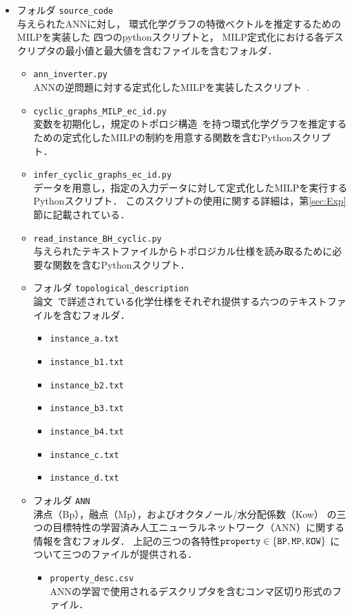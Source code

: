 \documentclass[11pt, titlepage, dvipdfmx, twoside]{jarticle}
\newcommand{\target}{目標}
\begin{document}
\begin{itemize}

\item フォルダ {\tt source\_code}\\
  与えられたANNに対し，
  環式化学グラフの特徴ベクトルを推定するためのMILPを実装した
  四つのpythonスクリプトと，
  MILP定式化における各デスクリプタの最小値と最大値を含むファイルを含むフォルダ．

\begin{itemize}

\item {\tt ann\_inverter.py}\\
ANNの逆問題に対する定式化したMILPを実装したスクリプト~\cite{AN19}.

\item {\tt cyclic\_graphs\_MILP\_ec\_id.py}\\
変数を初期化し，規定のトポロジ構造~\cite{cyclic_BH_arxiv}を持つ環式化学グラフを推定するための定式化したMILPの制約を用意する関数を含むPythonスクリプト．

\item {\tt infer\_cyclic\_graphs\_ec\_id.py}\\
データを用意し，指定の入力データに対して定式化したMILPを実行するPythonスクリプト．
このスクリプトの使用に関する詳細は，第\ref{sec:Exp}節に記載されている．

\item {\tt read\_instance\_BH\_cyclic.py}\\
与えられたテキストファイルからトポロジカル仕様を読み取るために必要な関数を含むPythonスクリプト．

\item フォルダ {\tt topological\_description}\\
論文~\cite{cyclic_BH_arxiv}で詳述されている化学仕様をそれぞれ提供する六つのテキストファイルを含むフォルダ．
%
\begin{itemize}
 \item {\tt instance\_a.txt}
 \item {\tt instance\_b1.txt}
 \item {\tt instance\_b2.txt}
 \item {\tt instance\_b3.txt}
 \item {\tt instance\_b4.txt}
 \item {\tt instance\_c.txt}
 \item {\tt instance\_d.txt}
\end{itemize}

\item フォルダ {\tt ANN}\\
沸点（Bp），融点（Mp），およびオクタノール/水分配係数（Kow）
の三つの\target 特性の学習済み人工ニューラルネットワーク（ANN）に関する情報を含むフォルダ．
上記の三つの各特性${\tt property}\in \{{\tt BP, MP, KOW}\}$ について三つのファイルが提供される．
%
\begin{itemize}
\item {\tt property\_desc.csv}\\
ANNの学習で使用されるデスクリプタを含むコンマ区切り形式のファイル．


\end{itemize}
\end{itemize}
\end{itemize}
\end{document}
